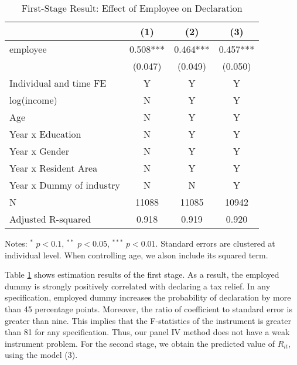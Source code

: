 \documentclass[
  11pt,
  a4paper,
]{article}
\begin{document}
\begin{table}

\caption{\label{tab:stage1Report}First-Stage Result: Effect of Employee on Declaration}
\centering
\fontsize{7}{9}\selectfont
\begin{threeparttable}
\begin{tabular}[t]{lccc}
\toprule
 & (1) & (2) & (3)\\
\midrule
employee & 0.508*** & 0.464*** & 0.457***\\
 & (0.047) & (0.049) & (0.050)\\
Individual and time FE & Y & Y & Y\\
log(income) & N & Y & Y\\
Age & N & Y & Y\\
Year x Education & N & Y & Y\\
Year x Gender & N & Y & Y\\
Year x Resident Area & N & Y & Y\\
Year x Dummy of industry & N & N & Y\\
N & 11088 & 11085 & 10942\\
Adjusted R-squared & 0.918 & 0.919 & 0.920\\
\bottomrule
\end{tabular}
\begin{tablenotes}
\item Notes: $^{*}$ $p < 0.1$, $^{**}$ $p < 0.05$, $^{***}$ $p < 0.01$. Standard errors are clustered at individual level. When controlling age, we alson include its squared term.
\end{tablenotes}
\end{threeparttable}
\end{table}

Table \ref{tab:stage1Report} shows estimation results of the first stage.
As a result, the employed dummy is strongly positively correlated with declaring a tax relief.
In any specification, employed dummy increases the probability of declaration by more than 45 percentage points.
Moreover, the ratio of coefficient to standard error is greater than nine.
This implies that the F-statistics of the instrument is greater than 81 for any specification.
Thus, our panel IV method does not have a weak instrument problem.
For the second stage, we obtain the predicted value of \(R_{it}\), using the model (3).
\end{document}
